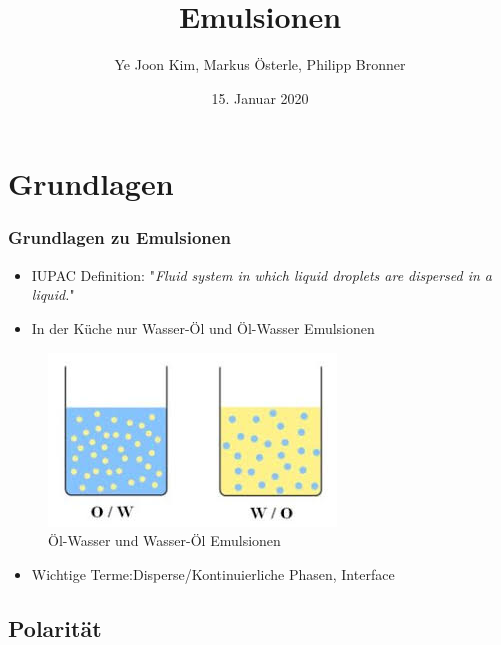 \documentclass{beamer} %
\title[Emulsionen ]{Emulsionen}
\subtitle[Seminar Physik in der Küche]{}
\date[15. Januar 2020]{15. Januar 2020}
\author[Markus, Phillip und Kim]{Ye Joon Kim, Markus \"Osterle, Philipp Bronner}
\begin{document}
\begin{frame}
\titlepage
\end{frame}

\section{Grundlagen}

\begin{frame}
\frametitle{Grundlagen zu Emulsionen}
\begin{itemize}
	\item IUPAC Definition: "\textit{Fluid system in which liquid droplets are dispersed in a liquid.}"\pause
	\item In der Küche nur Wasser-Öl und Öl-Wasser Emulsionen
\end{itemize}
	\begin{figure}
		\centering
		\includegraphics[width=0.5\linewidth]{owwo.jpg}
		\caption{Öl-Wasser und Wasser-Öl Emulsionen}
	\end{figure}\pause
\begin{itemize}
	\item{Wichtige Terme:Disperse/Kontinuierliche Phasen, Interface}
\end{itemize}
\end{frame}

\subsection{Polarität}
\end{document}
